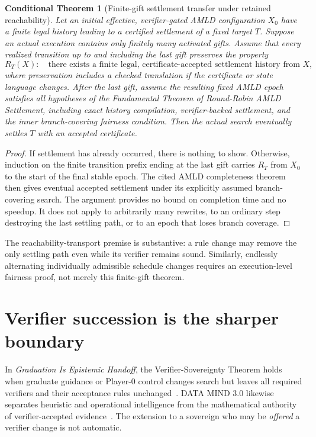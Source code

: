 \documentclass[11pt,letterpaper]{article}
\newtheorem{theorem}[definition]{Conditional Theorem}
\theoremstyle{remark}
\begin{document}
\begin{theorem}[Finite-gift settlement transfer under retained reachability]\label{thm:settlement}
Let an initial effective, verifier-gated AMLD configuration $X_0$ have a finite legal history leading to a certified settlement of a fixed target $T$. Suppose an actual execution contains only finitely many activated gifts. Assume that every realized transition up to and including the last gift preserves the property
\[
R_T(X):\quad \text{there exists a finite legal, certificate-accepted settlement history from $X$},
\]
where preservation includes a checked translation if the certificate or state language changes. After the last gift, assume the resulting fixed AMLD epoch satisfies all hypotheses of the Fundamental Theorem of Round-Robin AMLD Settlement, including exact history compilation, verifier-backed settlement, and the \emph{inner} branch-covering fairness condition. Then the actual search eventually settles $T$ with an accepted certificate.
\end{theorem}
\begin{proof}
If settlement has already occurred, there is nothing to show. Otherwise, induction on the finite transition prefix ending at the last gift carries $R_T$ from $X_0$ to the start of the final stable epoch. The cited AMLD completeness theorem then gives eventual accepted settlement under its explicitly assumed branch-covering search. The argument provides no bound on completion time and no speedup. It does not apply to arbitrarily many rewrites, to an ordinary step destroying the last settling path, or to an epoch that loses branch coverage.
\end{proof}

The reachability-transport premise is substantive: a rule change may remove the only settling path even while its verifier remains sound. Similarly, endlessly alternating individually admissible schedule changes requires an execution-level fairness proof, not merely this finite-gift theorem.

\section{Verifier succession is the sharper boundary}
In \emph{Graduation Is Epistemic Handoff}, the Verifier-Sovereignty Theorem holds when graduate guidance or Player-0 control changes search but leaves all required verifiers and their acceptance rules unchanged~\cite{Graduation}. DATA MIND 3.0 likewise separates heuristic and operational intelligence from the mathematical authority of verifier-accepted evidence~\cite{DataMind}. The extension to a sovereign who may be \emph{offered} a verifier change is not automatic.
\end{document}
